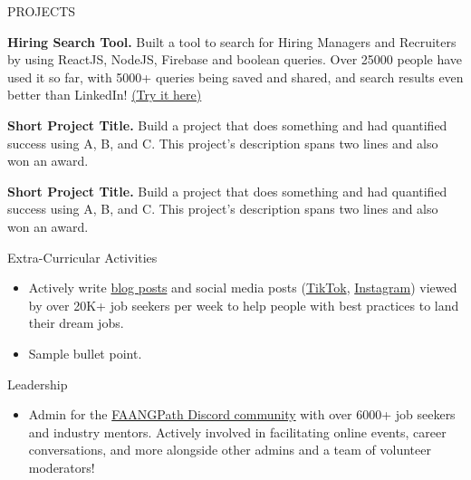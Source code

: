 \documentclass{resume} %
\begin{document}

\begin{rSection}{PROJECTS}
\vspace{-1.25em}
\item \textbf{Hiring Search Tool.} {Built a tool to search for Hiring Managers and Recruiters by using ReactJS, NodeJS, Firebase and boolean queries. Over 25000 people have used it so far, with 5000+ queries being saved and shared, and search results even better than LinkedIn! \href{https://hiring-search.careerflow.ai/}{(Try it here)}}
\item \textbf{Short Project Title.} {Build a project that does something and had quantified success using A, B, and C. This project's description spans two lines and also won an award.}
\item \textbf{Short Project Title.} {Build a project that does something and had quantified success using A, B, and C. This project's description spans two lines and also won an award.}
\end{rSection} 

\begin{rSection}{Extra-Curricular Activities} 
\begin{itemize}
    \item 	Actively write \href{https://www.faangpath.com/blog/}{blog posts} and social media posts (\href{https://www.tiktok.com/@faangpath}{TikTok}, \href{https://www.instagram.com/faangpath/?hl=en}{Instagram}) viewed by over 20K+ job seekers per week to help people with best practices to land their dream jobs. 
    \item	Sample bullet point.
\end{itemize}


\end{rSection}

\begin{rSection}{Leadership} 
\begin{itemize}
    \item Admin for the \href{https://discord.com/invite/WWbjEaZ}{FAANGPath Discord community} with over 6000+ job seekers and industry mentors. Actively involved in facilitating online events, career conversations, and more alongside other admins and a team of volunteer moderators! 
\end{itemize}


\end{rSection}
\end{document}

